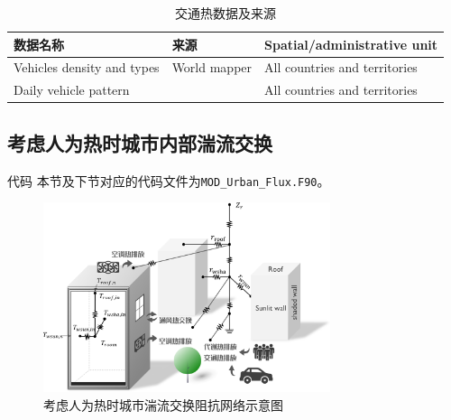 \begin{table}[htbp]
    \centering
\caption{交通热数据及来源}\label{tab:交通热数据及来源}
    \begin{tabular}{@{}lll@{}}
    \toprule
    数据名称                       & 来源                          & Spatial/administrative unit   \\ \midrule
    Vehicles density and types & World mapper                & All countries and territories \\
    Daily vehicle pattern      & \citet{Hallenbeck1997} & All countries and territories \\\bottomrule
    \end{tabular}
\end{table}

\subsection{考虑人为热时城市内部湍流交换}

\begin{mymdframed}{代码}
本节及下节对应的代码文件为\texttt{MOD\_Urban\_Flux.F90}。
\end{mymdframed}
{
\begin{figure}[h!]
\centering
\includegraphics[width=0.75\textwidth]{Figures/城市模式/CoLM城市模式人为热阻抗交换网络.png}
\caption{考虑人为热时城市湍流交换阻抗网络示意图}
\label{fig:考虑人为热时城市内部湍流交换过程}
\end{figure}
}

